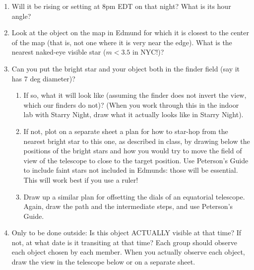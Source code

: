 \begin{enumerate}
\item Will it be rising or setting at 8pm EDT on that night?  What is its
hour angle?
\vspace{40pt}
\item Look at the object on the map in Edmund for which it is closest
to the center of the map (that is, not one where it is very near the
edge). What is the nearest naked-eye visible star ($m<3.5$ in NYC!)?
\vspace{40pt}
\item Can you put the bright star and your object both in the finder
field (say it has 7 deg diameter)? 
\begin{enumerate}
\item If so,  what it will look like
(assuming the finder does not invert the view, which our finders do
not)? (When you work through this in the indoor lab with Starry Night,
draw what it actually looks like in Starry Night).
\vspace{180pt}
\clearpage
\item If not, plot on a separate sheet a plan for how to star-hop from
  the nearest bright star to this one, as described in class, by
  drawing below the positions of the bright stars and how you would
  try to move the field of view of the telescope to close to the
  target position. Use Peterson's Guide to include faint stars not
  included in Edmunds: those will be essential. This will work best if
  you use a ruler!
\item Draw up a similar plan for offsetting the dials of an equatorial
  telescope.  Again, draw the path and the intermediate steps, and use
  Peterson's Guide. 
\end{enumerate}
\vspace{220pt}
\item Only to be done outside: Is this object ACTUALLY visible at that
  time? If not, at what date is it transiting at that time? Each group
  should observe each object chosen by each member.  When you actually
  observe each object, draw the view in the telescope below or on a
  separate sheet.
\end{enumerate}
